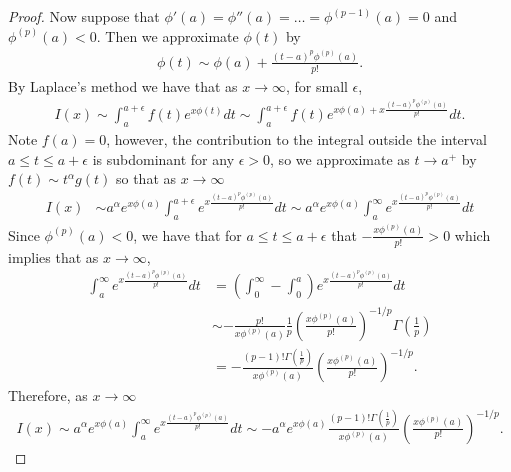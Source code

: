 \documentclass[12pt]{article}
\theoremstyle{definition}
\begin{document}
\begin{proof}
  Now suppose that $\phi'(a) = \phi''(a) = \dots = \phi^{(p-1)}(a) = 0$ and $\phi^{(p)}(a) < 0$. Then we approximate $\phi(t)$ by
  \begin{align*}
    \phi(t) \sim \phi(a) + \frac{(t-a)^p\phi^{(p)}(a)}{p!}.
  \end{align*}
  By Laplace's method we have that as $x \to \infty$, for small $\epsilon$,
  \begin{align*}
    I(x) \sim \int_{a}^{a+\epsilon}f(t)e^{x\phi(t)}dt \sim \int_{a}^{a+\epsilon}f(t)e^{x\phi(a) + x\frac{(t-a)^p\phi^{(p)}(a)}{p!}}dt.
  \end{align*}
  Note $f(a) = 0$, however, the contribution to the integral outside the interval $a\leq t \leq a +\epsilon$
  is subdominant for any $\epsilon > 0$, so we approximate as $t\to a^+$ by $f(t) \sim t^\alpha g(t)$ so that
  as $x\to \infty$
  \begin{align*}
    I(x) &\sim a^\alpha e^{x\phi(a)} \int_{a}^{a+\epsilon}e^{x\frac{(t-a)^p\phi^{(p)}(a)}{p!}}dt \sim a^\alpha e^{x\phi(a)} \int_{a}^{\infty}e^{x\frac{(t-a)^p\phi^{(p)}(a)}{p!}}dt
  \end{align*}
  Since $\phi^{(p)}(a) < 0$, we have that for $a\leq t \leq a +\epsilon$ that $-\frac{x\phi^{(p)}(a)}{p!} > 0$ which implies that
  as $x\to \infty$,
  \begin{align*}
    \int_{a}^{\infty} e^{x\frac{(t-a)^p\phi^{(p)}(a)}{p!}}dt &= \left(\int_{0}^{\infty} - \int_{0}^{a} \right)e^{x\frac{(t-a)^p\phi^{(p)}(a)}{p!}}dt\\
    &\sim -\frac{p!}{x\phi^{(p)}(a)}\frac{1}{p}\left(\frac{x\phi^{(p)}(a)}{p!}\right)^{-1/p} \Gamma\left(\frac{1}{p}\right)\\
    &= -\frac{(p-1)!\Gamma\left(\frac{1}{p}\right)}{x\phi^{(p)}(a)}\left(\frac{x\phi^{(p)}(a)}{p!}\right)^{-1/p} .
  \end{align*}
  Therefore, as $x\to \infty$
  \begin{align*}
    I(x)  \sim a^\alpha e^{x\phi(a)} \int_{a}^{\infty}e^{x\frac{(t-a)^p\phi^{(p)}(a)}{p!}}dt \sim -a^\alpha e^{x\phi(a)}  \frac{(p-1)!\Gamma\left(\frac{1}{p}\right)}{x\phi^{(p)}(a)}\left(\frac{x\phi^{(p)}(a)}{p!}\right)^{-1/p}.
  \end{align*}

\end{proof}
\newpage
\end{document}
